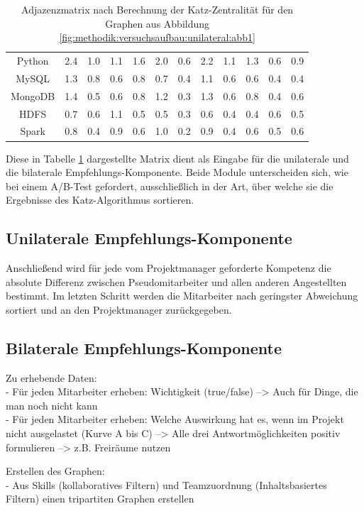 \begin{table}[h]
\begin{tabular}{c|c|c|c|c|c|c|c|c|c|c|c}
		Python   & 2.4 & 1.0 & 1.1 & 1.6 & 2.0 & 0.6 & 2.2 & 1.1 & 1.3 & 0.6 & 0.9\\
		MySQL    & 1.3 & 0.8 & 0.6 & 0.8 & 0.7 & 0.4 & 1.1 & 0.6 & 0.6 & 0.4 & 0.4\\
		MongoDB  & 1.4 & 0.5 & 0.6 & 0.8 & 1.2 & 0.3 & 1.3 & 0.6 & 0.8 & 0.4 & 0.6\\
		HDFS     & 0.7 & 0.6 & 1.1 & 0.5 & 0.5 & 0.3 & 0.6 & 0.4 & 0.4 & 0.6 & 0.5\\
		Spark    & 0.8 & 0.4 & 0.9 & 0.6 & 1.0 & 0.2 & 0.9 & 0.4 & 0.6 & 0.5 & 0.6
	\end{tabular}
	\caption{Adjazenzmatrix nach Berechnung der Katz-Zentralität für den Graphen aus Abbildung \ref{fig:methodik:versuchsaufbau:unilateral:abb1}}
	\label{tbl:methodik:versuchsaufbau:unilateral:tbl1}
\end{table}

Diese in Tabelle \ref{tbl:methodik:versuchsaufbau:unilateral:tbl1} dargestellte Matrix dient als Eingabe für die unilaterale und die bilaterale Empfehlungs-Komponente. Beide Module unterscheiden sich, wie bei einem A/B-Test gefordert, ausschließlich in der Art, über welche sie die Ergebnisse des Katz-Algorithmus sortieren.

\subsection{Unilaterale Empfehlungs-Komponente}
\label{ch:methodik:versuchsaufbau:unilateral}
Anschließend wird für jede vom Projektmanager geforderte Kompetenz die absolute Differenz zwischen Pseudomitarbeiter und allen anderen Angestellten bestimmt. Im letzten Schritt werden die Mitarbeiter nach geringster Abweichung sortiert und an den Projektmanager zurückgegeben.

\subsection{Bilaterale Empfehlungs-Komponente}
\label{ch:methodik:versuchsaufbau:bilateral}

\newpage
Zu erhebende Daten:\\
- Für jeden Mitarbeiter erheben: Wichtigkeit (true/false) --> Auch für Dinge, die man noch nicht kann\\
- Für jeden Mitarbeiter erheben: Welche Auswirkung hat es, wenn im Projekt nicht ausgelastet (Kurve A bis C) --> Alle drei Antwortmöglichkeiten positiv formulieren --> z.B. Freiräume nutzen

Erstellen des Graphen:\\
- Aus Skills (kollaboratives Filtern) und Teamzuordnung (Inhaltsbasiertes Filtern) einen tripartiten Graphen erstellen\\

